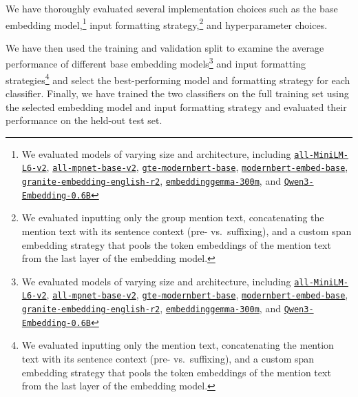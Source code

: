 \documentclass[12pt]{article}
\begin{document}
We have thoroughly evaluated several implementation choices such as the base embedding model,\footnote{We evaluated models of varying size and architecture, including
  \href{https://huggingface.co/sentence-transformers/all-MiniLM-L6-v2}{\texttt{all-MiniLM-L6-v2}},
  \href{https://huggingface.co/sentence-transformers/all-mpnet-base-v2}{\texttt{all-mpnet-base-v2}},
  \href{https://huggingface.co/Alibaba-NLP/gte-modernbert-base}{\texttt{gte-modernbert-base}},
  \href{https://huggingface.co/nomic-ai/modernbert-embed-base}{\texttt{modernbert-embed-base}},
  \href{https://huggingface.co/ibm-granite/granite-embedding-english-r2}{\texttt{granite-embedding-english-r2}},
  \href{https://huggingface.co/google/embeddinggemma-300m}{\texttt{embeddinggemma-300m}},
  and
  \href{https://huggingface.co/Qwen/Qwen3-Embedding-0.6B}{\texttt{Qwen3-Embedding-0.6B}}} input formatting strategy,\footnote{We evaluated inputting only the group mention text, concatenating the mention text with its sentence context (pre- vs.~suffixing), and a custom span embedding strategy that pools the token embeddings of the mention text from the last layer of the embedding model.} and hyperparameter choices.

We have then used the training and validation split to examine the average performance of different base embedding models\footnote{We evaluated models of varying size and architecture, including
  \href{https://huggingface.co/sentence-transformers/all-MiniLM-L6-v2}{\texttt{all-MiniLM-L6-v2}},
  \href{https://huggingface.co/sentence-transformers/all-mpnet-base-v2}{\texttt{all-mpnet-base-v2}},
  \href{https://huggingface.co/Alibaba-NLP/gte-modernbert-base}{\texttt{gte-modernbert-base}},
  \href{https://huggingface.co/nomic-ai/modernbert-embed-base}{\texttt{modernbert-embed-base}},
  \href{https://huggingface.co/ibm-granite/granite-embedding-english-r2}{\texttt{granite-embedding-english-r2}},
  \href{https://huggingface.co/google/embeddinggemma-300m}{\texttt{embeddinggemma-300m}},
  and
  \href{https://huggingface.co/Qwen/Qwen3-Embedding-0.6B}{\texttt{Qwen3-Embedding-0.6B}}} and input formatting strategies\footnote{We evaluated inputting only the mention text, concatenating the mention text with its sentence context (pre- vs.~suffixing), and a custom span embedding strategy that pools the token embeddings of the mention text from the last layer of the embedding model.} and select the best-performing model and formatting strategy for each classifier.
Finally, we have trained the two classifiers on the full training set using the selected embedding model and input formatting strategy and evaluated their performance on the held-out test set.
\end{document}
